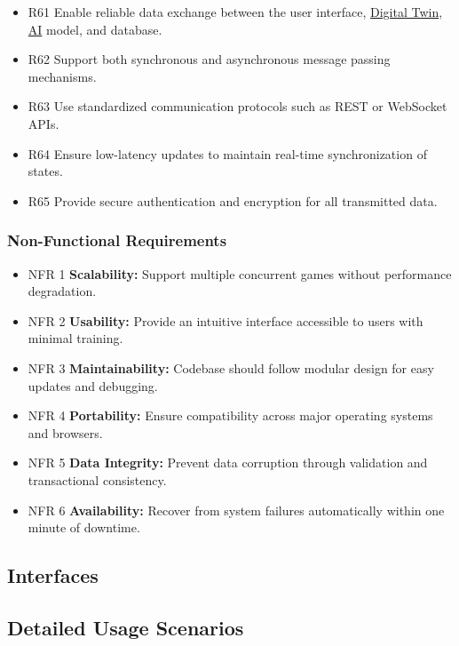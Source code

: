 \documentclass{article}
\newcommand{\AI}{\href{https://en.wikipedia.org/wiki/Artificial_intelligence}{AI}}
\newcommand{\DigitalTwin}{\href{https://en.wikipedia.org/wiki/Digital_twin}{Digital Twin}}
\begin{document}
\begin{itemize}
  \item R61 Enable reliable data exchange between the user interface, \DigitalTwin{},
        \AI{} model, and database.
  \item R62 Support both synchronous and asynchronous message passing mechanisms.
  \item R63 Use standardized communication protocols such as REST or WebSocket APIs.
  \item R64 Ensure low-latency updates to maintain real-time synchronization of states.
  \item R65 Provide secure authentication and encryption for all transmitted data.

\end{itemize}

\subsubsection{Non-Functional Requirements}

\begin{itemize}
  \item NFR 1 \textbf{Scalability:} Support multiple concurrent games without
        performance degradation.
  \item NFR 2 \textbf{Usability:} Provide an intuitive interface accessible to users
        with minimal training.
  \item NFR 3 \textbf{Maintainability:} Codebase should follow modular design for easy
        updates and debugging.
  \item NFR 4 \textbf{Portability:} Ensure compatibility across major operating systems
        and browsers.
  \item NFR 5 \textbf{Data Integrity:} Prevent data corruption through validation and
        transactional consistency.
  \item NFR 6 \textbf{Availability:} Recover from system failures automatically within
        one minute of downtime.
\end{itemize}


\subsection{Interfaces}\label{subsec:interfaces}
\subsection{Detailed Usage Scenarios}\label{subsec:detailed-usage-scenarios}
\end{document}
